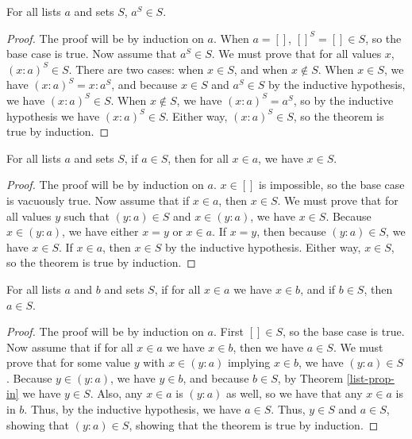 \documentclass[../math.tex]{subfiles}
\begin{document}
\begin{theorem} \label{list-prop-filter}
    For all lists $a$ and sets $S$, $a^S \in S$.
\end{theorem}
\begin{proof}
    The proof will be by induction on $a$.  When $a = []$, $[]^S = [] \in S$, so
    the base case is true.  Now assume that $a^S \in S$.  We must prove that for
    all values $x$, $(x : a)^S \in S$.  There are two cases: when $x \in S$, and
    when $x \notin S$.  When $x \in S$, we have $(x : a)^S = x : a^S$, and
    because $x \in S$ and $a^S \in S$ by the inductive hypothesis, we have $(x :
    a)^S \in S$.  When $x \notin S$, we have $(x : a)^S = a^S$, so by the
    inductive hypothesis we have $(x : a)^S \in S$.  Either way, $(x : a)^S \in
    S$, so the theorem is true by induction.
\end{proof}

\begin{theorem} \label{list-prop-in}
    For all lists $a$ and sets $S$, if $a \in S$, then for all $x \in a$, we
    have $x \in S$.
\end{theorem}
\begin{proof}
    The proof will be by induction on $a$.  $x \in []$ is impossible, so the
    base case is vacuously true.  Now assume that if $x \in a$, then $x \in S$.
    We must prove that for all values $y$ such that $(y : a) \in S$ and $x \in
    (y : a)$, we have $x \in S$.  Because $x \in (y : a)$, we have either $x =
    y$ or $x \in a$.  If $x = y$, then because $(y : a) \in S$, we have $x \in
    S$.  If $x \in a$, then $x \in S$ by the inductive hypothesis.  Either way,
    $x \in S$, so the theorem is true by induction.
\end{proof}

\begin{theorem} \label{list-prop-in-sub}
    For all lists $a$ and $b$ and sets $S$, if for all $x \in a$ we have $x \in
    b$, and if $b \in S$, then $a \in S$.
\end{theorem}
\begin{proof}
    The proof will be by induction on $a$.  First $[] \in S$, so the base case
    is true.  Now assume that if for all $x \in a$ we have $x \in b$, then we
    have $a \in S$.  We must prove that for some value $y$ with $x \in (y : a)$
    implying $x \in b$, we have $(y : a) \in S$.  Because $y \in (y : a)$, we
    have $y \in b$, and because $b \in S$, by Theorem \ref{list-prop-in} we have
    $y \in S$.  Also, any $x \in a$ is $(y : a)$ as well, so we have that any $x
    \in a$ is in $b$.  Thus, by the inductive hypothesis, we have $a \in S$.
    Thus, $y \in S$ and $a \in S$, showing that $(y : a) \in S$, showing that
    the theorem is true by induction.
\end{proof}
\end{document}

